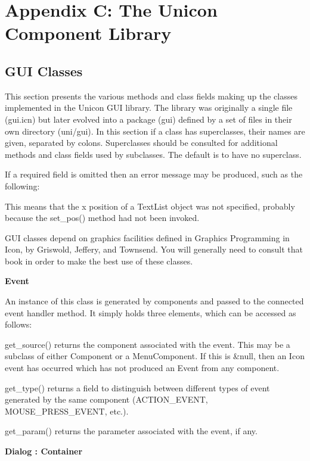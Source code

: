 \clearpage\section{Appendix C: The Unicon Component Library}
\subsection{GUI Classes}

This section presents the various methods and class fields making up the
classes implemented in the Unicon GUI library. The library was
originally a single file (gui.icn) but later evolved into a package
(gui) defined by a set of files in their own directory (uni/gui). In
this section if a class has superclasses, their names are given,
separated by colons. Superclasses should be consulted for additional
methods and class fields used by subclasses. The
default is to have no superclass.

If a required field is omitted then an error message may be produced,
such as the following:


This means that the x position of a TextList object was not specified,
probably because the set\_pos() method had not been invoked.

GUI classes depend on graphics facilities defined in
{\textquotedbl}Graphics Programming in Icon{\textquotedbl}, by
Griswold, Jeffery, and Townsend. You will generally need to consult
that book in order to make the best use of these classes.

{\sffamily\bfseries
{}Event}

An instance of this class is generated by components and passed to the
connected event handler method. It simply holds three elements, which
can be accessed as follows:

get\_source() returns the component associated with the event. This may
be a subclass of either Component or a MenuComponent. If this is
\&null, then an Icon event has occurred which has not produced an Event
from any component.

get\_type() returns a field to distinguish between different types of
event generated by the same component (ACTION\_EVENT,
MOUSE\_PRESS\_EVENT, etc.).

get\_param() returns the parameter associated with the event, if any.

{\sffamily\bfseries
{}Dialog : Container}

